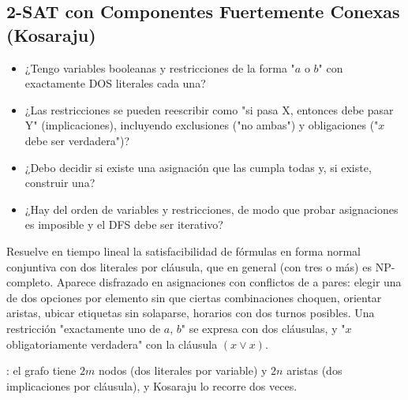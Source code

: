 \subsection{2-SAT con Componentes Fuertemente Conexas (Kosaraju)}
\label{alg:4-19}


\begin{itemize}
\item ¿Tengo variables booleanas y restricciones de la forma "$a$ o $b$" con exactamente DOS literales cada una?
\item ¿Las restricciones se pueden reescribir como "si pasa X, entonces debe pasar Y" (implicaciones), incluyendo exclusiones ("no ambas") y obligaciones ("$x$ debe ser verdadera")?
\item ¿Debo decidir si existe una asignación que las cumpla todas y, si existe, construir una?
\item ¿Hay del orden de  variables y restricciones, de modo que probar asignaciones es imposible y el DFS debe ser iterativo?
\end{itemize}

 Resuelve en tiempo lineal la satisfacibilidad de fórmulas en forma normal conjuntiva con dos literales por cláusula, que en general (con tres o más) es NP-completo. Aparece disfrazado en asignaciones con conflictos de a pares: elegir una de dos opciones por elemento sin que ciertas combinaciones choquen, orientar aristas, ubicar etiquetas sin solaparse, horarios con dos turnos posibles. Una restricción "exactamente uno de $a$, $b$" se expresa con dos cláusulas, y "$x$ obligatoriamente verdadera" con la cláusula $(x \lor x)$.

 : el grafo tiene $2m$ nodos (dos literales por variable) y $2n$ aristas (dos implicaciones por cláusula), y Kosaraju lo recorre dos veces.

